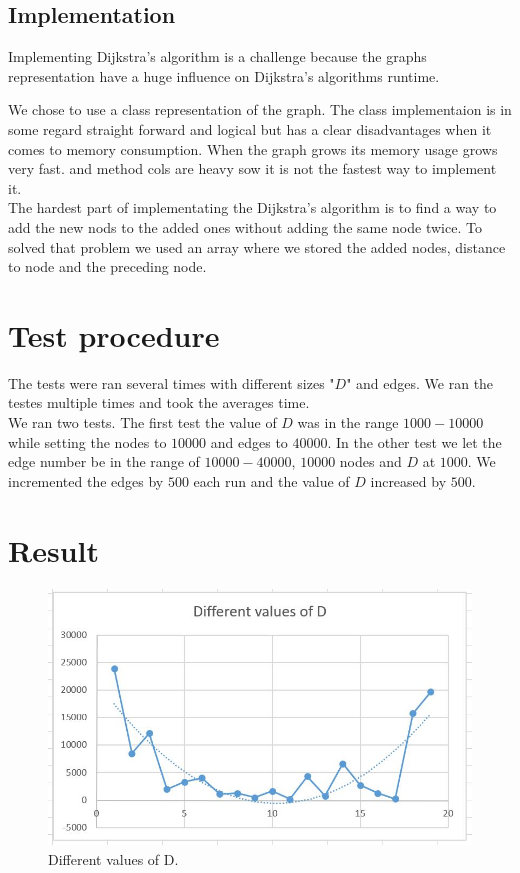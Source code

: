 \documentclass[paper=a4, fontsize=11pt]{scrartcl}
\numberwithin{equation}{section}		%
\numberwithin{figure}{section}			%
\numberwithin{table}{section}				%
\begin{document}
\subsection{Implementation}
Implementing Dijkstra’s algorithm is a challenge because the graphs representation have a huge influence on Dijkstra’s algorithms runtime.

 We chose to use a class representation of the graph. The class implementaion is in some regard straight forward and logical but has a clear disadvantages when it comes to memory consumption. When the graph grows its memory usage grows very fast. and method cols are heavy sow it is not the fastest way to implement it.
\\

The hardest part of implementating the Dijkstra’s algorithm is to find a way to add the new nods to the added ones without adding the same node twice. To solved that problem we used an array where we stored the added nodes, distance to node and the preceding node.


\section{Test procedure}
The tests were ran several times with different sizes "$D$" and edges. We ran the testes multiple times and took the averages time.
\\
We ran two tests. The first test the value of $D$ was in the range $1 000-10 000$ while setting the nodes to $10 000$ and edges to $40 000$. In the other test we let the edge number be in the range of $10 000-40 000$, $10 000$ nodes and  $D$ at $1000$. We incremented the edges by $500$ each run and the value of $D$ increased by $500$.
\\

\section{Result}

\begin{figure}[h!]
  \includegraphics[width=\linewidth]{d.jpg}
  \caption{Different values of D.}
  \label{fig:result}
\end{figure}
\end{document}
